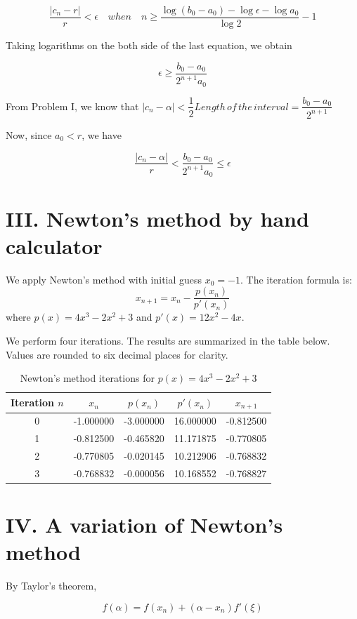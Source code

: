 \documentclass[a4paper]{article}
\begin{document}
$$\dfrac{|c_n - r|}r < \epsilon \quad when \quad n \ge \frac{\log(b_0 - a_0) - \log \epsilon - \log a_0}{\log 2} - 1 $$

Taking logarithms on the both side of the last equation, we obtain

$$\epsilon \ge \dfrac{b_0 - a_0}{2^{n+1} a_0}$$

From Problem I, we know that $|c_n - \alpha |< \dfrac12 Length \, of \, the \, interval = \dfrac{b_0 - a_0}{2^{n+1}}$

Now, since $a_0 < r$, we have

$$\dfrac{|c_n - \alpha |}{r} < \dfrac{b_0 - a_0}{2^{n+1} a_0} \le \epsilon$$

\section*{III. Newton's method by hand calculator}

We apply Newton's method with initial guess \( x_0 = -1 \). The iteration formula is:
\[
x_{n+1} = x_n - \frac{p(x_n)}{p'(x_n)}
\]
where \( p(x) = 4x^3 - 2x^2 + 3 \) and \( p'(x) = 12x^2 - 4x \).

We perform four iterations. The results are summarized in the table below. Values are rounded to six decimal places for clarity.

\begin{table}[h]
\centering
\begin{tabular}{ccccc}
\toprule
Iteration \( n \) & \( x_n \) & \( p(x_n) \) & \( p'(x_n) \) & \( x_{n+1} \) \\
\midrule
0 & -1.000000 & -3.000000 & 16.000000 & -0.812500 \\
1 & -0.812500 & -0.465820 & 11.171875 & -0.770805 \\
2 & -0.770805 & -0.020145 & 10.212906 & -0.768832 \\
3 & -0.768832 & -0.000056 & 10.168552 & -0.768827 \\
\bottomrule
\end{tabular}
\caption{Newton's method iterations for \( p(x) = 4x^3 - 2x^2 + 3 \)}
\end{table}

\section*{IV. A variation of Newton's method}

By Taylor's theorem,

$$f(\alpha) = f(x_n) + (\alpha - x_n)f'(\xi)$$
\end{document}
